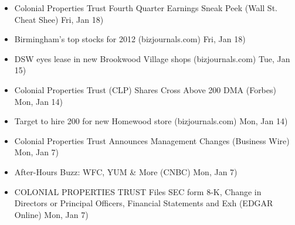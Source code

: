 \documentclass[11pt,asymmetric]{article}
\begin{document}
\begin{itemize}
\item Colonial Properties Trust Fourth Quarter Earnings Sneak Peek (Wall St. Cheat Shee) Fri, Jan 18)
\item Birmingham's top stocks for 2012 (bizjournals.com) Fri, Jan 18)
\item DSW eyes lease in new Brookwood Village shops (bizjournals.com) Tue, Jan 15)
\item Colonial Properties Trust (CLP) Shares Cross Above 200 DMA (Forbes) Mon, Jan 14)
\item Target to hire 200 for new Homewood store (bizjournals.com) Mon, Jan 14)
\item Colonial Properties Trust Announces Management Changes (Business Wire) Mon, Jan 7)
\item After-Hours Buzz: WFC, YUM \& More (CNBC) Mon, Jan 7)
\item COLONIAL PROPERTIES TRUST Files SEC form 8-K, Change in Directors or Principal Officers, Financial Statements and Exh (EDGAR Online) Mon, Jan 7)
\end{itemize}
\end{document}
